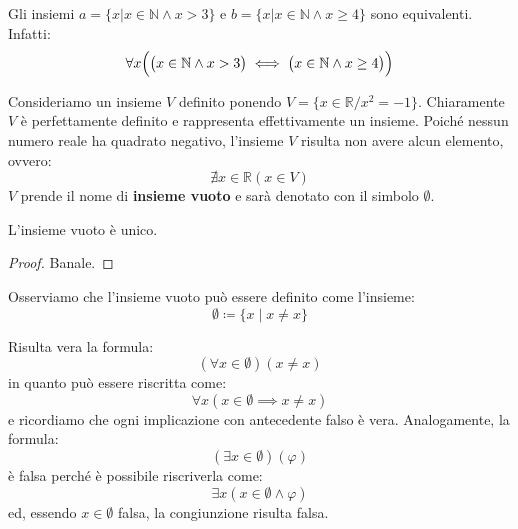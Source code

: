 \begin{example}
	Gli insiemi $a=\{x|x \in \mathbb{N} \wedge x>3\}$ e $b=\{x|x \in \mathbb{N} \wedge x \geq 4\}$ sono equivalenti. Infatti:
	\begin{displaymath}
		\forall x \Bigl(\bigl(  x \in \mathbb{N} \wedge x>3\bigr) \iff \bigl( x \in \mathbb{N} \wedge x \geq 4   \bigr) \Bigr)
	\end{displaymath}
\end{example}

Consideriamo un insieme $V$ definito ponendo $V= \{x \in \mathbb{R} / x^{2} = -1\}$. Chiaramente $V$ è perfettamente definito e rappresenta effettivamente un insieme. Poiché nessun numero reale ha quadrato negativo, l'insieme $V$ risulta non avere alcun elemento, ovvero:
\begin{displaymath}
	\nexists x \in \mathbb{R} ( x \in V)
\end{displaymath}
$V$ prende il nome di \textbf{insieme vuoto} e sarà denotato con il simbolo $\emptyset$.

\begin{lemmabox}
	L'insieme vuoto è unico.
\end{lemmabox}

\begin{proof} 
	Banale. 
\end{proof}

Osserviamo che l'insieme vuoto può essere definito come l'insieme:
\begin{equation}
	\emptyset \coloneqq \{x \; | \; x \neq x\}
\end{equation} 

\begin{osservation}
	Risulta vera la formula:
	\begin{displaymath}
		(\forall x \in \emptyset)(x \neq x)
	\end{displaymath}
	in quanto può essere riscritta come:
	\begin{displaymath}
		\forall x (x \in \emptyset \implies x \neq x)
	\end{displaymath}
	e ricordiamo che ogni implicazione con antecedente falso è vera. Analogamente, la formula:
	\begin{displaymath}
		(\exists x \in \emptyset)(\varphi)
	\end{displaymath}
	è falsa perché è possibile riscriverla come:
	\begin{displaymath}
		\exists x (x \in \emptyset \land \varphi)
	\end{displaymath}
	ed, essendo $x \in \emptyset$ falsa, la congiunzione risulta falsa.
\end{osservation}

